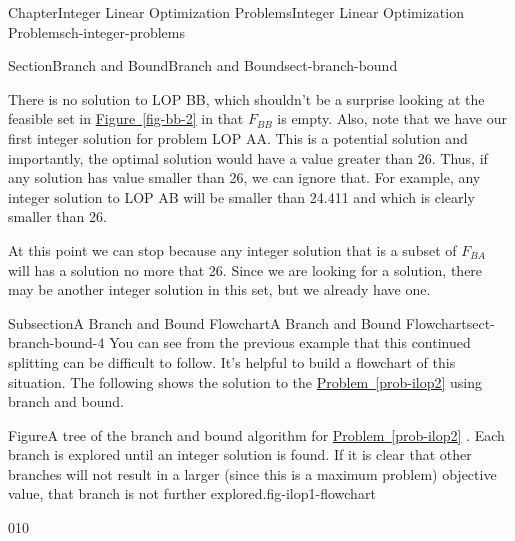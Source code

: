 \documentclass[oneside,10pt,]{book}
\newcommand{\xreffont}{\relax}
\numberwithin{equation}{section}
\begin{document}
\begin{chapterptx}{Chapter}{Integer Linear Optimization Problems}{}{Integer Linear Optimization Problems}{}{}{ch-integer-problems}
\begin{sectionptx}{Section}{Branch and Bound}{}{Branch and Bound}{}{}{sect-branch-bound}
\begin{introduction}{}
There is no solution to LOP BB, which shouldn't be a surprise looking at the feasible set in \hyperref[fig-bb-2]{Figure~{\xreffont\ref{fig-bb-2}}} in that \(F_{BB}\) is empty. Also, note that we have our first integer solution for problem LOP AA. This is a potential solution and importantly, the optimal solution would have a value greater than 26. Thus, if any solution has value smaller than 26, we can ignore that. For example, any integer solution to LOP AB will be smaller than 24.411 and which is clearly smaller than 26.%
\par
At this point we can stop because any integer solution that is a subset of \(F_{BA}\) will has a solution no more that 26. Since we are looking for a solution, there may be another integer solution in this set, but we already have one.%
\end{introduction}%
%
%
\typeout{************************************************}
\typeout{************************************************}
%
\begin{subsectionptx}{Subsection}{A Branch and Bound Flowchart}{}{A Branch and Bound Flowchart}{}{}{sect-branch-bound-4}
You can see from the previous example that this continued splitting can be difficult to follow. It's helpful to build a flowchart of this situation. The following shows the solution to the \hyperref[prob-ilop2]{Problem~{\xreffont\ref{prob-ilop2}}} using branch and bound.%
\begin{figureptx}{Figure}{A tree of the branch and bound algorithm for \hyperref[prob-ilop2]{Problem~{\xreffont\ref{prob-ilop2}}} . Each branch is explored until an integer solution is  found. If it is clear that other branches will not result in a larger (since this is a maximum problem) objective value, that branch is not further explored.}{fig-ilop1-flowchart}{}%
\begin{image}{0}{1}{0}{}%
\end{image}
\end{figureptx}
\end{subsectionptx}
\end{sectionptx}
\end{chapterptx}
\end{document}
